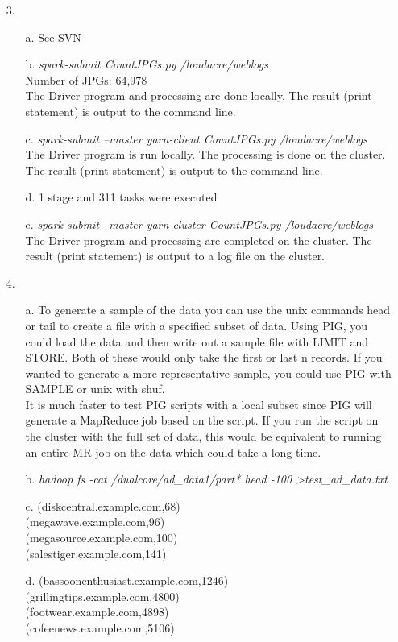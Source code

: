 \documentclass{article}
\begin{document}
\begin{itemize}
\pagebreak
\setlength{\headsep}{5pt}
\item[3.]
	\begin{itemize}
		\item[a.] See SVN
		\item[b.] \textit{spark-submit CountJPGs.py /loudacre/weblogs}\\
		Number of JPGs: 64,978\\
		The Driver program and processing are done locally. The result (print statement) is output to the command line.
		\item[c.] \textit{spark-submit --master yarn-client CountJPGs.py /loudacre/weblogs}\\
		The Driver program is run locally. The processing is done on the cluster. The result (print statement) is output to the command line.
		\item[d.] 1 stage and 311 tasks were executed
		\item[e.] \textit{spark-submit --master yarn-cluster CountJPGs.py /loudacre/weblogs}\\
		The Driver program and processing are completed on the cluster. The result (print statement) is output to a log file on the cluster.
	\end{itemize}
	
\pagebreak
\setlength{\headsep}{5pt}
\item[4.]
	\begin{itemize}
		\item[a.] To generate a sample of the data you can use the unix commands head or tail to create a file with a specified subset of data. Using PIG, you could load the data and then write out a sample file with LIMIT and STORE. Both of these would only take the first or last n records. If you wanted to generate a more representative sample, you could use PIG with SAMPLE or unix with shuf.\\
		
		It is much faster to test PIG scripts with a local subset since PIG will generate a MapReduce job based on the script. If you run the script on the cluster with the full set of data, this would be equivalent to running an entire MR job on the data which could take a long time.
		\item[b.] \textit{hadoop fs -cat /dualcore/ad\_data1/part* \text{\textbar} head -100 \textgreater  test\_ad\_data.txt}
		\item[c.] 
			(diskcentral.example.com,68)\\
			(megawave.example.com,96)\\
			(megasource.example.com,100)\\
			(salestiger.example.com,141)
		\item[d.]
			(bassoonenthusiast.example.com,1246)\\
			(grillingtips.example.com,4800)\\
			(footwear.example.com,4898)\\
			(cofeenews.example.com,5106)
	\end{itemize}


\end{itemize}
\end{document}
